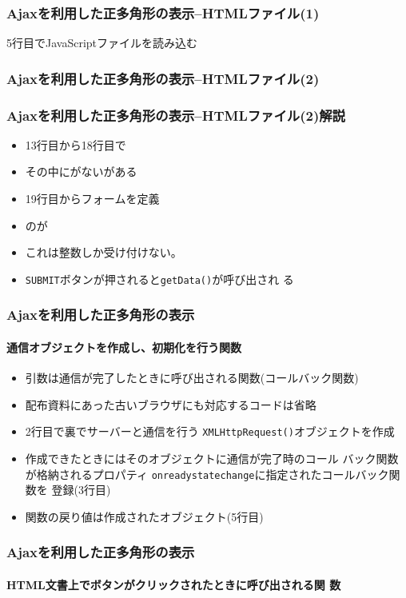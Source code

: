 \begin{frame}[containsverbatim]
 \frametitle{Ajaxを利用した正多角形の表示--HTMLファイル(1)}
 5行目でJavaScriptファイルを読み込む
\end{frame}
\begin{frame}[containsverbatim]
 \frametitle{Ajaxを利用した正多角形の表示--HTMLファイル(2)}
\end{frame}
\begin{frame}[containsverbatim]
 \frametitle{Ajaxを利用した正多角形の表示--HTMLファイル(2)解説}
 \begin{itemize}
  \item 13行目から18行目で     
  \item その中にがないがある
  \item 19行目からフォームを定義
	\item {}のが
	\item これは整数しか受け付けない。
  \item \texttt{SUBMIT}ボタンが押されると\texttt{getData()}が呼び出され
        る
 \end{itemize}
\end{frame}
\begin{frame}[containsverbatim]
 \frametitle{Ajaxを利用した正多角形の表示}
 \framesubtitle{通信オブジェクトを作成し、初期化を行う関数}
 \begin{itemize}
	\item 引数は通信が完了したときに呼び出される関数(コールバック関数)
	\item 配布資料にあった古いブラウザにも対応するコードは省略 
	\item 2行目で裏でサーバーと通信を行う
				\texttt{XMLHttpRequest()}オブジェクトを作成
	\item 作成できたときにはそのオブジェクトに通信が完了時のコール
				バック関数が格納されるプロパティ
				\texttt{onreadystatechange}に指定されたコールバック関数を
				登録(3行目)
	\item 関数の戻り値は作成されたオブジェクト(5行目)
 \end{itemize}
\end{frame}
\begin{frame}[containsverbatim]
 \frametitle{Ajaxを利用した正多角形の表示}
 \framesubtitle{HTML文書上でボタンがクリックされたときに呼び出される関
 数}
\end{frame}
